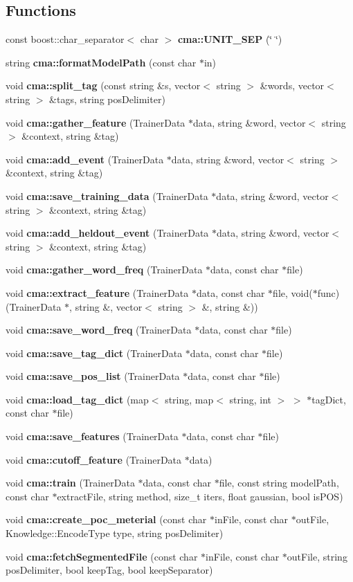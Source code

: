 \subsection*{Functions}
\begin{DoxyCompactItemize}
\item 
const boost::char\_\-separator$<$ char $>$ {\bfseries cma::UNIT\_\-SEP} (\char`\"{} \char`\"{})\label{namespacecma_af0620dd94c72d29cdfd5879862a0fa3c}

\item 
string {\bf cma::formatModelPath} (const char $\ast$in)
\item 
void {\bf cma::split\_\-tag} (const string \&s, vector$<$ string $>$ \&words, vector$<$ string $>$ \&tags, string posDelimiter)
\item 
void {\bf cma::gather\_\-feature} (TrainerData $\ast$data, string \&word, vector$<$ string $>$ \&context, string \&tag)
\item 
void {\bf cma::add\_\-event} (TrainerData $\ast$data, string \&word, vector$<$ string $>$ \&context, string \&tag)
\item 
void {\bf cma::save\_\-training\_\-data} (TrainerData $\ast$data, string \&word, vector$<$ string $>$ \&context, string \&tag)
\item 
void {\bf cma::add\_\-heldout\_\-event} (TrainerData $\ast$data, string \&word, vector$<$ string $>$ \&context, string \&tag)
\item 
void {\bf cma::gather\_\-word\_\-freq} (TrainerData $\ast$data, const char $\ast$file)
\item 
void {\bf cma::extract\_\-feature} (TrainerData $\ast$data, const char $\ast$file, void($\ast$func)(TrainerData $\ast$, string \&, vector$<$ string $>$ \&, string \&))
\item 
void {\bf cma::save\_\-word\_\-freq} (TrainerData $\ast$data, const char $\ast$file)
\item 
void {\bf cma::save\_\-tag\_\-dict} (TrainerData $\ast$data, const char $\ast$file)
\item 
void {\bfseries cma::save\_\-pos\_\-list} (TrainerData $\ast$data, const char $\ast$file)\label{namespacecma_a3f1398255ff5b9455a32b5c26b37c73d}

\item 
void {\bf cma::load\_\-tag\_\-dict} (map$<$ string, map$<$ string, int $>$ $>$ $\ast$tagDict, const char $\ast$file)
\item 
void {\bf cma::save\_\-features} (TrainerData $\ast$data, const char $\ast$file)
\item 
void {\bf cma::cutoff\_\-feature} (TrainerData $\ast$data)
\item 
void {\bf cma::train} (TrainerData $\ast$data, const char $\ast$file, const string modelPath, const char $\ast$extractFile, string method, size\_\-t iters, float gaussian, bool isPOS)
\item 
void {\bf cma::create\_\-poc\_\-meterial} (const char $\ast$inFile, const char $\ast$outFile, Knowledge::EncodeType type, string posDelimiter)
\item 
void {\bf cma::fetchSegmentedFile} (const char $\ast$inFile, const char $\ast$outFile, string posDelimiter, bool keepTag, bool keepSeparator)
\end{DoxyCompactItemize}
